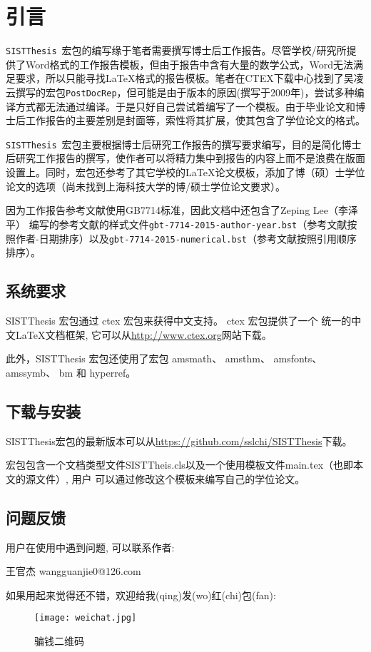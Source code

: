 \chapter{引言}
\texttt{SISTThesis}~宏包的编写缘于笔者需要撰写博士后工作报告。尽管学校/研究所提供了Word格式的工作报告模板，但由于报告中含有大量的数学公式，Word无法满足要求，所以只能寻找\LaTeX 格式的报告模板。笔者在CTEX下载中心找到了吴凌云撰写的宏包\texttt{PostDocRep}，但可能是由于版本的原因(撰写于2009年)，尝试多种编译方式都无法通过编译。于是只好自己尝试着编写了一个模板。由于毕业论文和博士后工作报告的主要差别是封面等，索性将其扩展，使其包含了学位论文的格式。

\texttt{SISTThesis}~宏包主要根据博士后研究工作报告的撰写要求编写，目的是简化博士后研究工作报告的撰写，使作者可以将精力集中到报告的内容上而不是浪费在版面设置上。同时，宏包还参考了其它学校的\LaTeX 论文模板，添加了博（硕）士学位论文的选项（尚未找到上海科技大学的博/硕士学位论文要求）。

因为工作报告参考文献使用GB7714标准，因此文档中还包含了Zeping Lee（李泽平） 编写的参考文献的样式文件\verb|gbt-7714-2015-author-year.bst|（参考文献按照作者-日期排序）以及\verb|gbt-7714-2015-numerical.bst|（参考文献按照引用顺序排序）。
\section{系统要求}
SISTThesis 宏包通过 ctex 宏包来获得中文支持。 ctex 宏包提供了一个
统一的中文\LaTeX 文档框架, 它可以从\url{http://www.ctex.org}网站下载。

此外，SISTThesis 宏包还使用了宏包 amsmath、 amsthm、 amsfonts、
amssymb、 bm 和 hyperref。
\section{下载与安装}
SISTThesis宏包的最新版本可以从\url{https://github.com/sslchi/SISTThesis}下载。

宏包包含一个文档类型文件SISTTheis.cls以及一个使用模板文件main.tex（也即本文的源文件）, 用户
可以通过修改这个模板来编写自己的学位论文。
\section{问题反馈}
用户在使用中遇到问题, 可以联系作者:
\begin{center}
    王官杰 \qquad \qquad wangguanjie0@126.com
\end{center}

如果用起来觉得还不错，欢迎给我({\color{red}qing})发({\color{red}wo})红({\color{red}chi})包({\color{red}fan}):\\
\begin{figure}[htb]
\begin{center}
    \texttt{[image: weichat.jpg]}
\end{center}
\caption{骗钱二维码}
\end{figure}